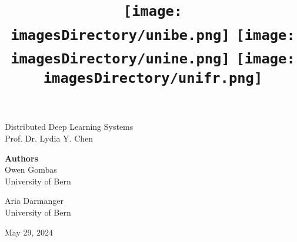 % 
\title{
    \texttt{[image: \\imagesDirectory/unibe.png]}\hspace{2.5cm}
    \texttt{[image: \\imagesDirectory/unine.png]}\hspace{2.5cm}
    \texttt{[image: \\imagesDirectory/unifr.png]}
    \vspace{1cm}\\
    \documentTitle
}
\date{\deliveryDate}

\headerFooter{%
    \fancyhead[L]{}%
    \fancyhead[C]{}%
    \fancyhead[R]{}%
}{\slshape\nouppercase{\leftmark}}{\thepage}{\deliveryDate}

\def\code#1{\texttt{#1}}


\begin{titlepage}

\sffamily

{%
\Large%
\noindent%
\justifying%
Distributed Deep Learning Systems\\
Prof. Dr. Lydia Y. Chen
}

\vfill

{%
\noindent%
\Huge%
\textbf{\documentTitle}%
}

\vspace{0.75cm}

{%
\raggedright%
\normalsize%
\textbf{Authors}\\
\vspace{0.1cm}%
\Large%
Owen Gombas\\
\vspace{0.1cm}%
\normalsize%
University of Bern
}

\vspace{0.2cm}

{%
\raggedright%
\normalsize%
\Large%
Aria Darmanger\\
\vspace{0.1cm}%
\normalsize%
University of Bern
}

\vspace{1cm}
\vfill

{%
\Large
\noindent
May 29, 2024
}
\end{titlepage}
\nocite{*}

\tableofcontents





% 









\appendix











